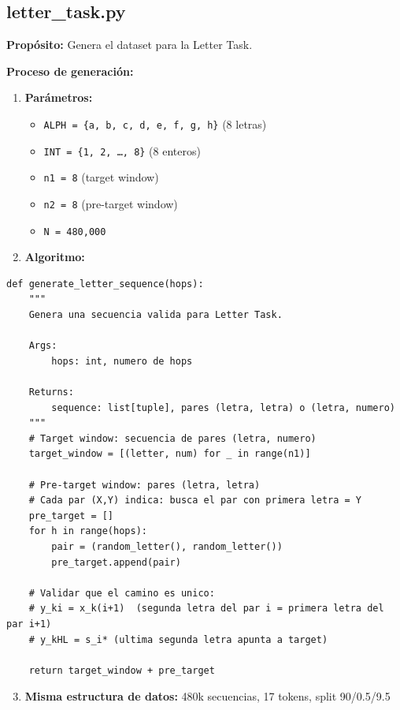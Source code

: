 \documentclass[12pt,a4paper]{report}
\begin{document}
\subsection{letter\_task.py}
\label{subsec:letter_task}

\textbf{Propósito:} Genera el dataset para la Letter Task.

\textbf{Proceso de generación:}

\begin{enumerate}
  \item \textbf{Parámetros:}
  \begin{itemize}
    \item \texttt{ALPH = \{a, b, c, d, e, f, g, h\}} (8 letras)
    \item \texttt{INT = \{1, 2, \ldots{}, 8\}} (8 enteros)
    \item \texttt{n1 = 8} (target window)
    \item \texttt{n2 = 8} (pre-target window)
    \item \texttt{N = 480{,}000}
  \end{itemize}

  \item \textbf{Algoritmo:}
\end{enumerate}

\begin{lstlisting}
def generate_letter_sequence(hops):
    """
    Genera una secuencia valida para Letter Task.
    
    Args:
        hops: int, numero de hops
    
    Returns:
        sequence: list[tuple], pares (letra, letra) o (letra, numero)
    """
    # Target window: secuencia de pares (letra, numero)
    target_window = [(letter, num) for _ in range(n1)]

    # Pre-target window: pares (letra, letra)
    # Cada par (X,Y) indica: busca el par con primera letra = Y
    pre_target = []
    for h in range(hops):
        pair = (random_letter(), random_letter())
        pre_target.append(pair)

    # Validar que el camino es unico:
    # y_ki = x_k(i+1)  (segunda letra del par i = primera letra del par i+1)
    # y_kHL = s_i* (ultima segunda letra apunta a target)

    return target_window + pre_target
\end{lstlisting}

\begin{enumerate}
  \setcounter{enumi}{2}
  \item \textbf{Misma estructura de datos:} 480k secuencias, 17 tokens, split 90/0.5/9.5
\end{enumerate}
\end{document}
